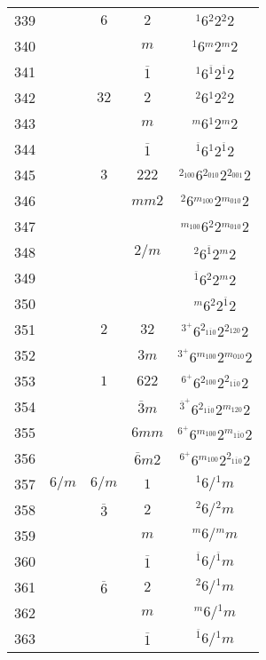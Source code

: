 \begin{longtable}{ccccc}
  339 &  & $6$ & $2$ & ${}^{1} 6 {}^{2} 2 {}^{2} 2 $\\
  340 &  &  & $m$ & ${}^{1} 6 {}^{m} 2 {}^{m} 2 $\\
  341 &  &  & $\overline{1}$ & ${}^{1} 6 {}^{\overline{1}} 2 {}^{\overline{1}} 2 $\\
  342 &  & $32$ & $2$ & ${}^{2} 6 {}^{1} 2 {}^{2} 2 $\\
  343 &  &  & $m$ & ${}^{m} 6 {}^{1} 2 {}^{m} 2 $\\
  344 &  &  & $\overline{1}$ & ${}^{\overline{1}} 6 {}^{1} 2 {}^{\overline{1}} 2 $\\
  345 &  & $3$ & $222$ & ${}^{2_{100}} 6 {}^{2_{010}} 2 {}^{2_{001}} 2 $\\
  346 &  &  & $mm2$ & ${}^{2} 6 {}^{m_{100}} 2 {}^{m_{010}} 2 $\\
  347 &  &  &  & ${}^{m_{100}} 6 {}^{2} 2 {}^{m_{010}} 2 $\\
  348 &  &  & $2/m$ & ${}^{2} 6 {}^{\overline{1}} 2 {}^{m} 2 $\\
  349 &  &  &  & ${}^{\overline{1}} 6 {}^{2} 2 {}^{m} 2 $\\
  350 &  &  &  & ${}^{m} 6 {}^{2} 2 {}^{\overline{1}} 2 $\\
  351 &  & $2$ & $32$ & ${}^{3^{+}} 6 {}^{2_{1\overline{1}0}} 2 {}^{2_{120}} 2 $\\
  352 &  &  & $3m$ & ${}^{3^{+}} 6 {}^{m_{100}} 2 {}^{m_{010}} 2 $\\
  353 &  & $1$ & $622$ & ${}^{6^{+}} 6 {}^{2_{100}} 2 {}^{2_{1\overline{1}0}} 2 $\\
  354 &  &  & $\overline{3}m$ & ${}^{\overline{3}^{+}} 6 {}^{2_{1\overline{1}0}} 2 {}^{m_{120}} 2 $\\
  355 &  &  & $6mm$ & ${}^{6^{+}} 6 {}^{m_{100}} 2 {}^{m_{1\overline{1}0}} 2 $\\
  356 &  &  & $\overline{6}m2$ & ${}^{6^{+}} 6 {}^{m_{100}} 2 {}^{2_{1\overline{1}0}} 2 $\\
  357 & $6/m$ & $6/m$ & $1$ & ${}^{1} 6  / {}^{1} m $\\
  358 &  & $\overline{3}$ & $2$ & ${}^{2} 6  / {}^{2} m $\\
  359 &  &  & $m$ & ${}^{m} 6  / {}^{m} m $\\
  360 &  &  & $\overline{1}$ & ${}^{\overline{1}} 6  / {}^{\overline{1}} m $\\
  361 &  & $\overline{6}$ & $2$ & ${}^{2} 6  / {}^{1} m $\\
  362 &  &  & $m$ & ${}^{m} 6  / {}^{1} m $\\
  363 &  &  & $\overline{1}$ & ${}^{\overline{1}} 6  / {}^{1} m $\\

\end{longtable}
